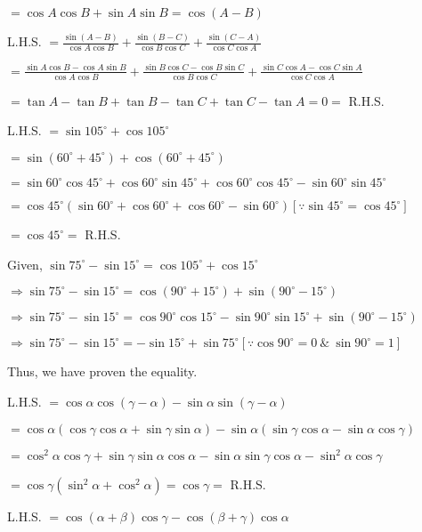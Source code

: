   $= \cos A\cos B + \sin A\sin B = \cos(A - B)$

\item L.H.S. $= \frac{\sin(A - B)}{\cos A\cos B} + \frac{\sin(B - C)}{\cos B\cos C} + \frac{\sin(C - A)}{\cos C\cos A}$

  $= \frac{\sin A\cos B - \cos A\sin B}{\cos A\cos B} + \frac{\sin B\cos C - \cos B\sin C}{\cos B\cos C} + \frac{\sin C\cos
  A - \cos C\sin A}{\cos C\cos A}$

  $= \tan A - \tan B + \tan B - \tan C + \tan C - \tan A = 0 =$ R.H.S.

\item L.H.S. $= \sin 105^\circ + \cos 105^\circ$

  $= \sin(60^\circ + 45^\circ) + \cos(60^\circ + 45^\circ)$

  $=\sin60^\circ\cos45^\circ + \cos60^\circ\sin45^\circ + \cos60^\circ\cos45^\circ - \sin60^\circ\sin45^\circ$

  $=\cos45^\circ(\sin60^\circ + \cos60^\circ + \cos60^\circ - \sin 60^\circ)[\because \sin45^\circ = \cos45^\circ]$

  $= \cos45^\circ =$ R.H.S.

\item Given, $\sin 75^\circ - \sin 15^\circ = \cos 105^\circ + \cos 15^\circ$

  $\Rightarrow \sin75^\circ -\sin15^\circ = \cos(90^\circ + 15^\circ) + \sin(90^\circ - 15^\circ)$

  $\Rightarrow \sin75^\circ -\sin15^\circ = \cos90^\circ\cos15^\circ - \sin90^\circ\sin15^\circ + \sin(90^\circ - 15^\circ)$

  $\Rightarrow \sin75^\circ -\sin15^\circ = -\sin15^\circ + \sin75^\circ [\because \cos90^\circ = 0~\&~\sin90^\circ = 1]$

  Thus, we have proven the equality.

\item L.H.S. $= \cos\alpha\cos(\gamma - \alpha) - \sin\alpha\sin(\gamma - \alpha)$

  $= \cos\alpha(\cos\gamma\cos\alpha + \sin\gamma\sin\alpha) - \sin\alpha(\sin\gamma\cos\alpha - \sin\alpha\cos\gamma)$

  $= \cos^2\alpha\cos\gamma + \sin\gamma\sin\alpha\cos\alpha - \sin\alpha\sin\gamma\cos\alpha - \sin^2\alpha\cos\gamma$

  $= \cos\gamma(\sin^2\alpha + \cos^2\alpha) = \cos\gamma =$ R.H.S.

\item L.H.S. $= \cos(\alpha + \beta)\cos\gamma - \cos(\beta + \gamma)\cos\alpha$

